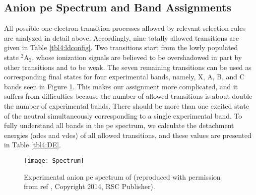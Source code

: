 \begin{refsection}
\subsection{Anion \acrshort{pe} Spectrum and Band Assignments}





All possible one-electron transition processes allowed by relevant selection rules are analyzed in detail above. Accordingly, nine totally allowed transitions are given in Table \ref{tbl4:ldconfig}. Two transitions start from the lowly populated state $^2$A$_2$, whose ionization signals are believed to be overshadowed in part by other transitions and to be weak. The seven remaining transitions can be used as corresponding final states for four experimental bands, namely, X, A, B, and C bands seen in Figure \ref{fig4:spectrum}. This makes our assignment more complicated, and it suffers from difficulties because the number of allowed transitions is about double the number of experimental bands. There should be more than one excited state of the neutral  simultaneously corresponding to a single experimental band. To fully understand all bands in the \acrshort{pe} spectrum, we calculate the detachment energies (\acrshort{ade}s and \acrshort{vde}s) of all allowed transitions, and these values are presented in Table \ref{tbl4:DE}.




\begin{figure}[htb!]
	\centering
	\texttt{[image: Spectrum]}
	\caption{Experimental anion \acrshort{pe} spectrum of  (reproduced with permission from ref , Copyright 2014, RSC Publisher).} 
	\label{fig4:spectrum}
\end{figure} 




\end{refsection}
